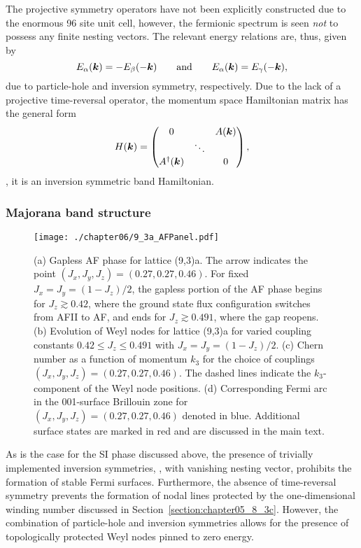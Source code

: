 The projective symmetry operators have not been explicitly constructed due to the enormous 96 site unit cell, however, the fermionic spectrum is seen \textit{not} to possess any finite nesting vectors.
The relevant energy relations are, thus, given by
%
\begin{equation}
	E_{\alpha}(\bm{k}) = -E_{\beta}(-\bm{k}) \qquad {\rm and} \qquad E_{\alpha}(\bm{k}) = E_{\gamma}(-\bm{k}),
\end{equation}
%
due to particle-hole and inversion symmetry, respectively.
Due to the lack of a projective time-reversal operator, the momentum space Hamiltonian matrix has the general form
%
\begin{equation}
	H(\bm{k}) = 
		\begin{pmatrix}
			0			&		 & A(\bm{k}) \\
			& \ddots & 		  \\
			A^{\dagger}(\bm{k})	&		 & 0
		\end{pmatrix},
\end{equation}
%
\ie, it is an inversion symmetric band Hamiltonian.


%
%
\subsubsection{Majorana band structure}
%
%
%
\begin{figure}[tb]
	\centering
	\texttt{[image: ./chapter06/9\_3a\_AFPanel.pdf]}
	\caption{
		(a) Gapless AF phase for lattice (9,3)a.
		The arrow indicates the point $(J_x, J_y, J_z) = (0.27, 0.27, 0.46)$.
		For fixed $J_x = J_y = (1 - J_z)/2$, the gapless portion of the AF phase begins for $J_z \gtrsim 0.42$, where the ground state flux configuration switches from AFII to AF, and ends for $J_z \gtrsim 0.491$, where the gap reopens.
		(b) Evolution of Weyl nodes for lattice (9,3)a for varied coupling constants $0.42 \leq J_z \leq 0.491$ with $J_x = J_y = (1 - J_z)/2$.
		(c) Chern number as a function of momentum $k_3$ for the choice of couplings $(J_x, J_y, J_z) = (0.27, 0.27, 0.46)$.
		The dashed lines indicate the $k_3$-component of the Weyl node positions.
		(d) Corresponding Fermi arc in the 001-surface Brillouin zone for $(J_x, J_y, J_z) = (0.27, 0.27, 0.46)$ denoted in blue.
		Additional surface states are marked in red and are discussed in the main text.
	}
	\label{fig:chapter06_AFPanel}
\end{figure}
%
As is the case for the SI phase discussed above, the presence of trivially implemented inversion symmetries, \ie, with vanishing nesting vector, prohibits the formation of stable Fermi surfaces.
Furthermore, the absence of time-reversal symmetry prevents the formation of nodal lines protected by the one-dimensional winding number discussed in Section~\ref{section:chapter05_8_3c}.
However, the combination of particle-hole and inversion symmetries allows for the presence of topologically protected Weyl nodes pinned to zero energy.

